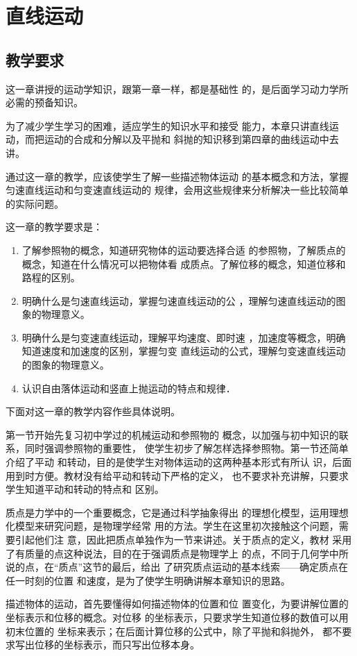 \chapter{直线运动}
\section{教学要求}
这一章讲授的运动学知识，跟第一章一样，都是基础性
的，是后面学习动力学所必需的预备知识。

为了减少学生学习的困难，适应学生的知识水平和接受
能力，本章只讲直线运动，而把运动的合成和分解以及平抛和
斜抛的知识移到第四章的曲线运动中去讲。

通过这一章的教学，应该使学生了解一些描述物体运动
的基本概念和方法，掌握匀速直线运动和匀变速直线运动的
规律，会用这些规律来分析解决一些比较简单的实际问题。

这一章的教学要求是：
\begin{enumerate}
\item 了解参照物的概念，知道研究物体的运动要选择合适
的参照物，了解质点的概念，知道在什么情况可以把物体看
成质点。了解位移的概念，知道位移和路程的区别。
\item 明确什么是匀速直线运动，掌握匀速直线运动的公
，理解匀速直线运动的图象的物理意义。
\item 明确什么是匀变速直线运动，理解平均速度、即时速
，加速度等概念，明确知道速度和加速度的区别，掌握匀变
直线运动的公式，理解匀变速直线运动的图象的物理意义。
\item 认识自由落体运动和竖直上抛运动的特点和规律．
\end{enumerate}

下面对这一章的教学内容作些具体说明。

第一节开始先复习初中学过的机械运动和参照物的
概念，以加强与初中知识的联系，同时强调参照物的重要性，
使学生初步了解怎样选择参照物。第一节还简单介绍了平动
和转动，目的是使学生对物体运动的这两种基本形式有所认
识，后面用到时方便。教材没有给平动和转动下严格的定义，
也不要求补充讲解，只要求学生知道平动和转动的特点和
区别。

质点是力学中的一个重要概念，它是通过科学抽象得出
的理想化模型，运用理想化模型来研究问题，是物理学经常
用的方法。学生在这里初次接触这个问题，需要引起他们注
意，因此把质点单独作为一节来讲述。关于质点的定义，教材
采用了有质量的点这种说法，目的在于强调质点是物理学上
的点，不同于几何学中所说的点，在“质点”这节的最后，给出
了研究质点运动的基本线索——确定质点在任一时刻的位置
和速度，是为了使学生明确讲解本章知识的思路。

描述物体的运动，首先要懂得如何描述物体的位置和位
置变化，为要讲解位置的坐标表示和位移的概念。对位移
的坐标表示，只要求学生知道位移的数值可以用初末位置的
坐标来表示；在后面计算位移的公式中，除了平抛和斜抛外，
都不要求写出位移的坐标表示，而只写出位移本身。

